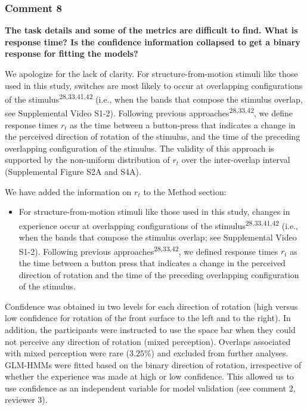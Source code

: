 \documentclass[
]{article}
\providecommand{\tightlist}{%
  \setlength{\itemsep}{0pt}\setlength{\parskip}{0pt}}
\begin{document}
\subsubsection{Comment 8}\label{comment-8}

\textbf{The task details and some of the metrics are difficult to find.
What is response time? Is the confidence information collapsed to get a
binary response for fitting the models?}

We apologize for the lack of clarity. For structure-from-motion stimuli
like those used in this study, switches are most likely to occur at
overlapping configurations of the stimulus\textsuperscript{28,33,41,42}
(i.e., when the bands that compose the stimulus overlap, see
Supplemental Video S1-2). Following previous
approaches\textsuperscript{28,33,42}, we define response times \(r_t\)
as the time between a button-press that indicates a change in the
perceived direction of rotation of the stimulus, and the time of the
preceding overlapping configuration of the stimulus. The validity of
this approach is supported by the non-uniform distribution of \(r_t\)
over the inter-overlap interval (Supplemental Figure S2A and S4A).

We have added the information on \(r_t\) to the Method section:

\begin{itemize}
\tightlist
\item
  For structure-from-motion stimuli like those used in this study,
  changes in experience occur at overlapping configurations of the
  stimulus\textsuperscript{28,33,41,42} (i.e., when the bands that
  compose the stimulus overlap; see Supplemental Video S1-2). Following
  previous approaches\textsuperscript{28,33,42}, we defined response
  times \(r_t\) as the time between a button press that indicates a
  change in the perceived direction of rotation and the time of the
  preceding overlapping configuration of the stimulus.
\end{itemize}

Confidence was obtained in two levels for each direction of rotation
(high versus low confidence for rotation of the front surface to the
left and to the right). In addition, the participants were instructed to
use the space bar when they could not perceive any direction of rotation
(mixed perception). Overlaps associated with mixed perception were rare
(\(3.25\)\%) and excluded from further analyses. GLM-HMMs were fitted
based on the binary direction of rotation, irrespective of whether the
experience was made at high or low confidence. This allowed us to use
confidence as an independent variable for model validation (see comment
2, reviewer 3).
\end{document}
